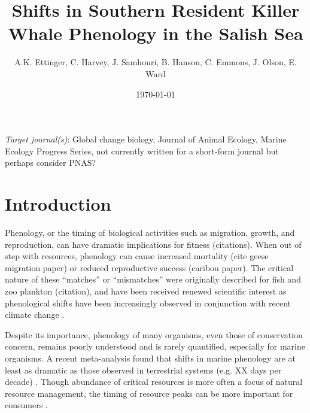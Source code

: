 \documentclass{article}
\begin{document}

\title{Shifts in Southern Resident Killer Whale Phenology in the Salish Sea}
\date{\today}
\maketitle
\author{A.K. Ettinger, C. Harvey, J. Samhouri, B. Hanson, C. Emmons, J. Olson, E. Ward}
\maketitle  %
\par 
\emph{Target journal(s)}: Global change biology, Journal of Animal Ecology, Marine Ecology Progress Series, not currently written for a short-form journal but perhaps consider PNAS?
\section* {Introduction}
\par Phenology, or the timing of biological activities such as migration, growth, and reproduction, can have dramatic implications for fitness (citations). When out of step with resources, phenology can cause increased mortality (cite geese migration paper) or reduced reproductive success (caribou paper). The critical nature of these ``matches'' or  ``mismatches'' were originally described for fish and zoo plankton (citation), and have been received renewed scientific interest as phenological shifts have been increasingly observed in conjunction with recent climate change \citep{durant2007}. 

\par Despite its importance, phenology of many organisms, even those of conservation concern, remains poorly understood and is rarely quantified, especially for marine organisms. A recent meta-analysis found that shifts in marine phenology are at least as dramatic as those observed in terrestrial systems (e.g. XX days per decade) \citep{poloczanska2013}. Though abundance of critical resources is more often a focus of natural resource management, the timing of resource peaks can be more important for consumers \citep{hipfner2008}.
 
\end{document}
